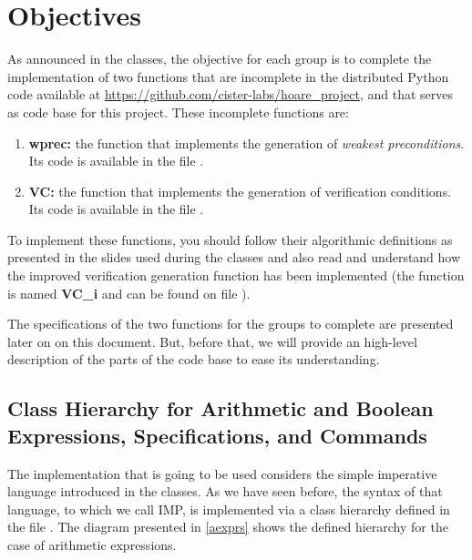 \documentclass[11pt]{article}
\begin{document}
\newcommand{\compn}[1]{\textsf{\textcolor{purple}{#1}}\xspace}
\newcommand{\chn}[1]{\textsf{\textcolor{teal}{#1}}\xspace}

\section{Objectives}

As announced in the classes, the objective for each group is to complete the implementation of two functions that are incomplete in the distributed  Python code available at \url{https://github.com/cister-labs/hoare_project}, and that serves as code base for this project. These incomplete functions are:\\

\begin{enumerate}
  \item \textbf{wprec:} the function that implements the generation of \textit{weakest preconditions}. Its code is available in the file .
  \item \textbf{VC:} the function that implements the generation of verification conditions. Its code is available in the file .
\end{enumerate}

To implement these functions, you should follow their algorithmic definitions as presented in the slides used during the classes and also read and understand how the improved verification generation function has been implemented (the function is named \textbf{VC\_i} and can be found on file ). 

The specifications of the two functions for the groups to complete are presented later on on this document. But, before that, we will provide an high-level description of the parts of the code base to ease its understanding.

\subsection{Class Hierarchy for Arithmetic and Boolean Expressions, Specifications, and Commands}

The implementation that is going to be used considers the simple imperative language introduced in the classes. As we have seen before, the syntax of that language, to which we call IMP, is implemented via a class hierarchy defined in the file . The diagram presented in \cref{aexprs} shows the defined hierarchy for the case of arithmetic expressions.
\end{document}
